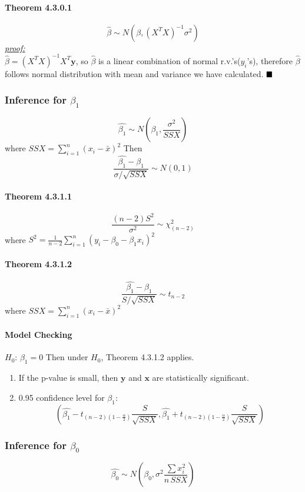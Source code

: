 \documentclass[11pt]{article}
\newcommand{\tb}[1]{\textbf{#1}}
\newcommand{\proof}[0]{\textit{\underline{proof:} }}
\newcommand{\vx}[0]{\tb{x}}
\newcommand{\vy}[0]{\tb{y}}
\newcommand{\qed}[0]{$\hfill\blacksquare$}
\begin{document}
\paragraph{Theorem 4.3.0.1} $$\hat{\beta} \sim N(\beta, (X^TX)^{-1}\sigma^2)$$
\proof\\
$\hat{\beta} = (X^TX)^{-1}X^T\vy$, so $\hat{\beta}$ is a linear combination of normal r.v.'s($y_i$'s), therefore $\hat{\beta}$ follows normal distribution with mean and variance we have calculated. \qed
\subsubsection{Inference for $\beta_1$}
$$\hat{\beta_1} \sim N(\beta_1, \frac{\sigma^2}{SSX})$$
where $SSX = \sum_{i=1}^n(x_i - \bar{x})^2$
Then $$\frac{\hat{\beta_1} - \beta_1}{\sigma/\sqrt{SSX}} \sim N(0,1)$$
\paragraph{Theorem 4.3.1.1}
$$\frac{(n-2)S^2}{\sigma^2} \sim \chi^2_{(n-2)}$$
where $S^2 = \frac{1}{n-2}\sum_{i=1}^n(y_i - \beta_0 - \beta_1x_i)^2$
\paragraph{Theorem 4.3.1.2}
$$\frac{\hat{\beta_1} - \beta_1}{S/\sqrt{SSX}} \sim t_{n-2}$$
where $SSX = \sum_{i=1}^n(x_i - \bar{x})^2$
\paragraph{Model Checking}
$H_0$: $\beta_1 = 0$
Then under $H_0$, Theorem 4.3.1.2 applies. 
\begin{enumerate}
    \item If the p-value is small, then $\vy$ and $\vx$ are statistically significant.
    \item 0.95 confidence level for $\beta_1$:
    $$(\hat{\beta_1} - t_{(n-2)(1-\frac{\alpha}{2})}\frac{S}{\sqrt{SSX}}, \hat{\beta_1} + t_{(n-2)(1-\frac{\alpha}{2})}\frac{S}{\sqrt{SSX}})$$
\end{enumerate}
\subsubsection{Inference for $\beta_0$}
$$\hat{\beta_0} \sim N(\beta_0, \sigma^2\frac{\sum x_i^2}{n\,SSX})$$
\end{document}
